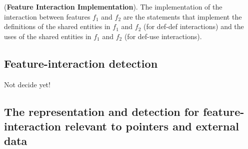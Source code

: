 \begin{Definition}{({\bf Feature Interaction Implementation}).} The implementation of the interaction between features $f_1$ and $f_2$ are the statements that implement the definitions of the shared entities in $f_1$ and $f_2$ (for def-def interactions) and the uses of the shared entities in $f_1$ and $f_2$ (for def-use interactions).
\end{Definition}
\subsection{Feature-interaction detection}
Not decide yet!





\subsection{The representation and detection for feature-interaction relevant to pointers and external data}